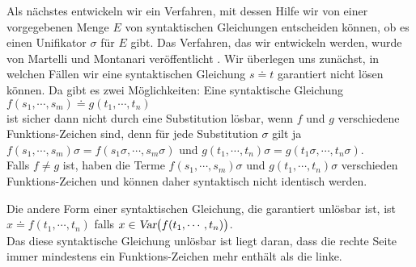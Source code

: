 Als nächstes entwickeln wir ein Verfahren, mit dessen Hilfe wir von einer vorgegebenen
Menge $E$ von syntaktischen Gleichungen entscheiden können, ob es einen Unifikator $\sigma$ für $E$
gibt.  Das Verfahren, das wir entwickeln werden, wurde von Martelli und Montanari veröffentlicht
\cite{martelli:1982}.  
Wir überlegen uns zunächst, in welchen Fällen wir eine syntaktischen Gleichung $s \doteq t$
garantiert nicht lösen können.  Da gibt es zwei Möglichkeiten: Eine syntaktische Gleichung  \\[0.2cm]
\hspace*{1.3cm} $f(s_1,\cdots,s_m) \doteq g(t_1,\cdots, t_n)$ \\[0.2cm]
ist sicher dann nicht durch eine Substitution lösbar, wenn $f$ und $g$ verschiedene
Funktions-Zeichen sind, denn für jede Substitution $\sigma$ gilt ja \\[0.2cm]
\hspace*{1.0cm} $f(s_1,\cdots,s_m)\sigma = f(s_1\sigma,\cdots,s_m\sigma)$ \quad und \quad
                $g(t_1,\cdots, t_n)\sigma = g(t_1\sigma,\cdots,t_n\sigma)$. \\[0.2cm]
Falls $f \not = g$ ist, haben die Terme  $f(s_1,\cdots,s_m)\sigma$ und $g(t_1,\cdots, t_n)\sigma$ verschieden
Funktions-Zeichen und können daher syntaktisch nicht identisch werden.

Die andere Form einer syntaktischen Gleichung, die garantiert unlösbar ist, ist\\[0.2cm]
\hspace*{1.3cm} $x \doteq f(t_1,\cdots,t_n)$  \quad falls $x \in \textsl{Var}\big(f(t_1,\cdots,t_n)\big)$. \\[0.2cm]
Das diese syntaktische Gleichung unlösbar ist liegt daran, dass die rechte Seite immer mindestens ein
Funktions-Zeichen mehr enthält als die linke.  

